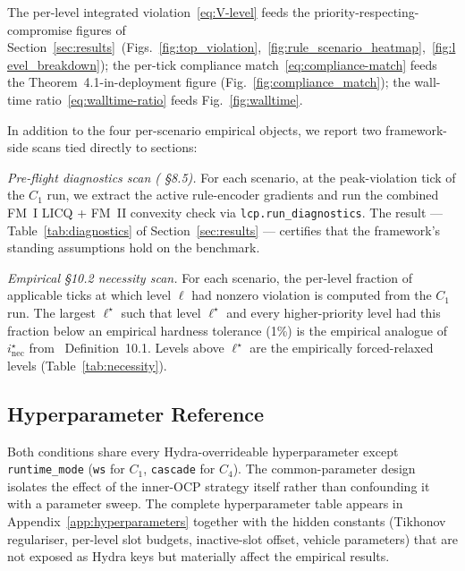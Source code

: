 The per-level integrated violation~\eqref{eq:V-level} feeds the priority-respecting-compromise figures of Section~\ref{sec:results}~(Figs.~\ref{fig:top_violation},~\ref{fig:rule_scenario_heatmap},~\ref{fig:level_breakdown}); the per-tick compliance match~\eqref{eq:compliance-match} feeds the Theorem~4.1-in-deployment figure (Fig.~\ref{fig:compliance_match}); the wall-time ratio~\eqref{eq:walltime-ratio} feeds Fig.~\ref{fig:walltime}.

In addition to the four per-scenario empirical objects, we report two framework-side scans tied directly to \cite{lcp2025} sections:

\emph{Pre-flight diagnostics scan (\cite{lcp2025} \S8.5).} For each scenario, at the peak-violation tick of the $C_1$ run, we extract the active rule-encoder gradients and run the combined FM~I LICQ + FM~II convexity check via \texttt{lcp.run\_diagnostics}. The result --- Table~\ref{tab:diagnostics} of Section~\ref{sec:results} --- certifies that the framework's standing assumptions hold on the benchmark.

\emph{Empirical \S10.2 necessity scan.} For each scenario, the per-level fraction of applicable ticks at which level $\ell$ had nonzero violation is computed from the $C_1$ run. The largest $\ell^\star$ such that level $\ell^\star$ and every higher-priority level had this fraction below an empirical hardness tolerance (1\%) is the empirical analogue of $i^\star_{\mathrm{nec}}$ from~\cite{lcp2025} Definition~10.1. Levels above $\ell^\star$ are the empirically forced-relaxed levels (Table~\ref{tab:necessity}).

\subsection{Hyperparameter Reference}
\label{sec:protocol:hyperparameters}

Both conditions share every Hydra-overrideable hyperparameter except \texttt{runtime\_mode} (\texttt{ws} for $C_1$, \texttt{cascade} for $C_4$). The common-parameter design isolates the effect of the inner-OCP strategy itself rather than confounding it with a parameter sweep. The complete hyperparameter table appears in Appendix~\ref{app:hyperparameters} together with the hidden constants (Tikhonov regulariser, per-level slot budgets, inactive-slot offset, vehicle parameters) that are not exposed as Hydra keys but materially affect the empirical results.
